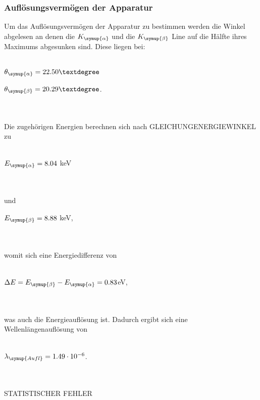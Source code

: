     \subsubsection{Auflösungsvermögen der Apparatur} 
        Um das Auflösungsvermögen der Apparatur zu bestimmen werden die Winkel abgelesen an denen die $K_{\symup{\alpha}}$ und die $K_{\symup{\beta}}$
        Line auf die Hälfte ihres Maximums abgesunken sind.
        Diese liegen bei:
        \\ \\
        \centerline{$\theta_{\symup{\alpha}} = 22.50°$}
        \centerline{$\theta_{\symup{\beta}} = 20.29°$.}
        \\ \\
        Die zugehörigen Energien berechnen sich nach GLEICHUNGENERGIEWINKEL zu
        \\ \\
        \centerline{$E_{\symup{\alpha}} = 8.04$ keV}
        \\ \\
        und 
        \centerline{$E_{\symup{\beta}} = 8.88$ keV,}
        \\ \\
        womit sich eine Energiedifferenz von 
        \\ \\
        \centerline{$\Delta E = E_{\symup{\beta}} - E_{\symup{\alpha}} = 0.83$eV,}
        \\ \\
        was auch die Energieauflösung ist.
        Dadurch ergibt sich eine Wellenlängenauflösung von 
        \\ \\
        \centerline{$\lambda_{\symup{Aufl}} = 1.49 \cdot 10^{-6}$.}
        \\ \\

        STATISTISCHER FEHLER

